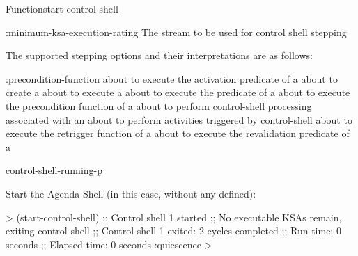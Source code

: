 \documentclass[10pt,twoside,english,pdftex]{article}
\begin{document}
\begin{functiondoc}{Function}{start-control-shell}
\begin{keywords}{:minimum-ksa-execution-rating}
   The stream to be used for control shell stepping

\end{keywords}


%
%
%
The supported stepping options and their interpretations are as follows:
\begin{keywords}{:precondition-function}
 about to execute the activation
predicate of a 
\keyword[:ks-activation] about to create a 
 about to execute a 
 about to execute the 
predicate of a 
 about to execute the precondition
function of a  
 about to perform control-shell processing
associated with an 
\keyword[:quiescence] about to perform activities triggered by 
control-shell  
 about to execute the retrigger
function of a  
 about to execute the revalidation predicate
of a  
\end{keywords}

\begin{alsos}{control-shell-running-p}
\end{alsos}

\fnexamples
%
Start the Agenda Shell (in this case, without any  defined):
%
\W\supp
\begin{example}
  > (start-control-shell)
  ;; Control shell 1 started
  ;; No executable KSAs remain, exiting control shell
  ;; Control shell 1 exited: 2 cycles completed
  ;; Run time: 0 seconds
  ;; Elapsed time: 0 seconds
  :quiescence
  >
\end{example}


\end{functiondoc}
\end{document}

